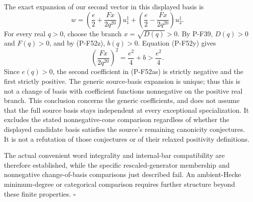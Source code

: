 \documentclass[11pt,a4paper]{article}
\begin{document}
The exact expansion of our second vector in this displayed
basis is
\[
        w=\left(\frac e2+\frac{Fx}{2q^{20}}\right)u_1^1
             +\left(\frac e2-\frac{Fx}{2q^{20}}\right)u_2^1.
                                                               \tag{P-F52as}
\]
For every real $q>0$, choose the branch $x=\sqrt{D(q)}>0$.
By P-F39, $D(q)>0$ and $F(q)>0$, and by (P-F52z),
$b(q)>0$. Equation (P-F52y) gives
\[
       \left(\frac{Fx}{2q^{20}}\right)^2
                          =\frac{e^2}{4}+b>\frac{e^2}{4}.
\]
Since $e(q)>0$, the second coefficient in (P-F52as) is
strictly negative and the first strictly positive.
The generic source-basis expansion is unique; thus this
is not a change of basis with coefficient functions
nonnegative on the positive real branch. This conclusion
concerns the generic coefficients, and does not assume
that the full source basis stays independent at every
exceptional specialization. It excludes the stated
nonnegative-cone comparison regardless of whether the
displayed candidate basis satisfies the source's remaining
canonicity conjectures. It is not a refutation of those
conjectures or of their relaxed positivity definitions.

The actual convenient word integrality and internal-bar
compatibility are therefore established, while the
specific rescaled-generator membership and nonnegative
change-of-basis comparisons just described fail.
An ambient-Hecke minimum-degree or categorical comparison
requires further structure beyond these finite properties.
\hfill$\square$
\end{document}
